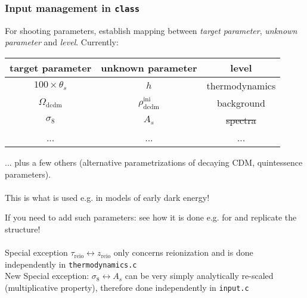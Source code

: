 \begin{frame}[fragile]
	\frametitle{Input management in {\tt \Red class}}
	
	For {\Red shooting} parameters, establish mapping between {\it target parameter}, {\it unknown parameter} and {\it level}. Currently:
	\begin{center}
		\begin{tabular}{|c|c|c|}
			\hline
			target parameter & unknown parameter & level\\
			\hline
			$100 \times \theta_s$ & $h$ & thermodynamics \\
			$\Omega_\mathrm{dcdm}$ & $\rho^\mathrm{ini}_\mathrm{dcdm}$ & background \\ \sout{$\sigma_8$} & \sout{$A_s$} & \sout{spectra} \\
			... & ... & ...\\
			\hline
		\end{tabular}
	\end{center}
	... plus a few others (alternative parametrizations of decaying CDM, quintessence parameters).\\
	\mbox{}\\
	This is what is used e.g. in models of early dark energy!\\
	
	\vspace{1cm}
	
	If you need to add such parameters: see how it is done e.g. for  and replicate the structure!\\
	\mbox{}\\
	{\color{purple}Special exception} $\tau_\mathrm{reio} \leftrightarrow z_\mathrm{reio}$ only concerns reionization and is done independently in \texttt{thermodynamics.c}
	\mbox{}\\
	{\Red New Special exception:} $\sigma_8 \leftrightarrow A_s$ can be very simply analytically re-scaled (multiplicative property), therefore done independently in \texttt{input.c}
\end{frame}




